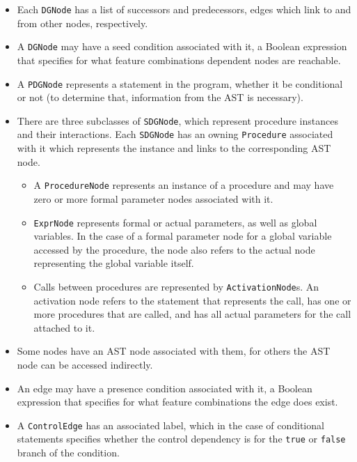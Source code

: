\begin{itemize}
  \item Each \lstinline|DGNode| has a list of successors and predecessors, edges which link to and from other nodes, 
  respectively.
  
  \item A \lstinline|DGNode| may have a seed condition associated with it, a Boolean expression that specifies for what 
  feature combinations dependent nodes are reachable.
  
  \item A \lstinline|PDGNode| represents a statement in the program, whether it be conditional or not (to determine 
  that, information from the AST is necessary).
  
  \item There are three subclasses of \lstinline|SDGNode|, which represent procedure instances and their interactions. 
  Each \lstinline|SDGNode| has an owning \lstinline|Procedure| associated with it which represents the instance and 
  links to the corresponding AST node.
  
  \begin{itemize}
    \item A \lstinline|ProcedureNode| represents an instance of a procedure and may have zero or more formal parameter 
    nodes associated with it.
    
    \item \lstinline|ExprNode| represents formal or actual parameters, as well as global variables. In the case of a 
    formal parameter node for a global variable accessed by the procedure, the node also refers to the actual node 
    representing the global variable itself.
    
    \item Calls between procedures are represented by \lstinline|ActivationNode|s. An activation node refers to the 
    statement that represents the call, has one or more procedures that are called, and has all actual parameters for 
    the call attached to it.
  \end{itemize}
  
  \item Some nodes have an AST node associated with them, for others the AST node can be accessed indirectly.
  
  \item An edge may have a presence condition associated with it, a Boolean expression that specifies for what feature 
  combinations the edge does exist.
  
  \item A \lstinline|ControlEdge| has an associated label, which in the case of conditional statements specifies 
  whether the control dependency is for the \lstinline|true| or \lstinline|false| branch of the condition.
\end{itemize}

